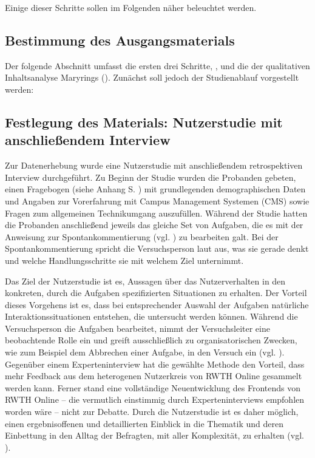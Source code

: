 Einige dieser Schritte sollen im Folgenden näher beleuchtet werden.

\subsection{Bestimmung des Ausgangsmaterials}

Der folgende Abschnitt umfasst die ersten drei Schritte, ,  und die  der qualitativen Inhaltsanalyse Maryrings (\cite[47]{mayring2010qualitative}). Zunächst soll jedoch der Studienablauf vorgestellt werden:

\subsection*{Festlegung des Materials: Nutzerstudie mit anschließendem Interview}

Zur Datenerhebung wurde eine Nutzerstudie mit anschließendem retrospektiven Interview durchgeführt. Zu Beginn der Studie wurden die Probanden gebeten, einen Fragebogen (siehe Anhang S. \pageref{att:Screeningbogen}) mit grundlegenden demographischen Daten und Angaben zur Vorerfahrung mit Campus Management Systemen (CMS) sowie Fragen zum allgemeinen Technikumgang auszufüllen. 
Während der Studie hatten die Probanden anschließend jeweils das gleiche Set von Aufgaben, die es mit der Anweisung zur Spontankommentierung (vgl. \cite{wharton1994cognitive}) zu bearbeiten galt. Bei der Spontankommentierung spricht die Versuchsperson laut aus, was sie gerade denkt und welche Handlungsschritte sie mit welchem Ziel unternimmt.

Das Ziel der Nutzerstudie ist es, Aussagen über das Nutzerverhalten in den konkreten, durch die Aufgaben spezifizierten Situationen zu erhalten. Der Vorteil dieses Vorgehens ist es, dass bei entsprechender Auswahl der Aufgaben natürliche Interaktionssituationen entstehen, die untersucht werden können. Während die Versuchsperson die Aufgaben bearbeitet, nimmt der Versuchsleiter eine beobachtende Rolle ein und greift ausschließlich zu organisatorischen Zwecken, wie zum Beispiel dem Abbrechen einer Aufgabe, in den Versuch ein (vgl. \cite{sarodnick2006methoden,rohrer_2014}). 
Gegenüber einem Experteninterview hat die gewählte Methode den Vorteil, dass mehr Feedback aus dem heterogenen Nutzerkreis von RWTH Online gesammelt werden kann. Ferner stand eine vollständige Neuentwicklung des Frontends von RWTH Online -- die vermutlich einstimmig durch Experteninterviews empfohlen worden wäre -- nicht zur Debatte. Durch die Nutzerstudie ist es daher möglich, einen ergebnisoffenen und detaillierten Einblick in die Thematik und deren Einbettung in den Alltag der Befragten, mit aller Komplexität, zu erhalten (vgl. \cite{sarodnick2006methoden,dumas1999practical}).

